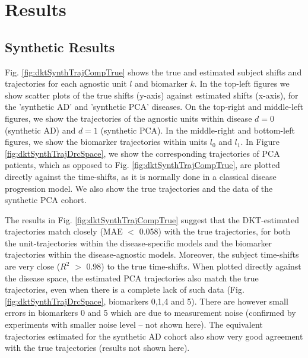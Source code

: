 \documentclass{llncs}
\begin{document}
\section{Results}
\label{sec:dktRes}

\subsection{Synthetic Results}
\label{sec:dktResSyn}

Fig. \ref{fig:dktSynthTrajCompTrue} shows the true and estimated subject shifts and trajectories for each agnostic unit $l$ and biomarker $k$. In the top-left figures we show scatter plots of the true shifts (y-axis) against estimated shifts (x-axis), for the 'synthetic AD' and 'synthetic PCA' diseases. On the top-right and middle-left figures, we show the trajectories of the agnostic units within disease $d=0$ (synthetic AD) and $d=1$ (synthetic PCA). In the middle-right and bottom-left figures, we show the biomarker trajectories within units $l_0$ and $l_1$. In Figure \ref{fig:dktSynthTrajDrcSpace}, we show the corresponding trajectories of PCA patients, which as opposed to Fig. \ref{fig:dktSynthTrajCompTrue}, are plotted directly against the time-shifts, as it is normally done in a classical disease progression model. We also show the true trajectories and the data of the synthetic PCA cohort.

The results in Fig. \ref{fig:dktSynthTrajCompTrue} suggest that the DKT-estimated trajectories match closely (MAE $<$ 0.058) with the true trajectories, for both the unit-trajectories within the disease-specific models and the biomarker trajectories within the disease-agnostic models. Moreover, the subject time-shifts are very close ($R^2$ $>$ 0.98) to the true time-shifts. When plotted directly against the disease space, the estimated PCA trajectories also match the true trajectories, even when there is a complete lack of such data (Fig. \ref{fig:dktSynthTrajDrcSpace}, biomarkers 0,1,4 and 5). There are however small errors in  biomarkers 0 and 5 which are due to measurement noise (confirmed by experiments with smaller noise level -- not shown here). The equivalent trajectories estimated for the synthetic AD cohort also show very good agreement with the true trajectories (results not shown here).

\end{document}
